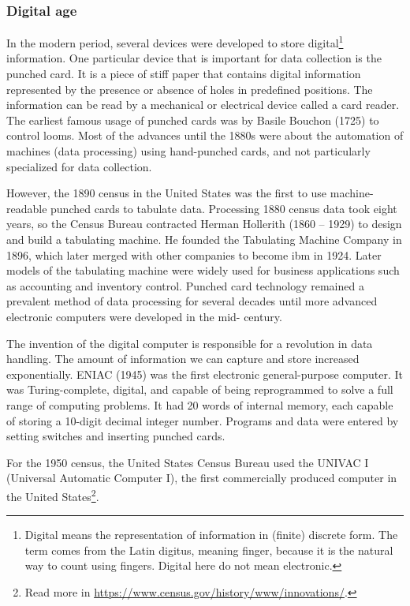 \subsubsection{Digital age}

In the modern period, several devices were developed to store digital\footnote{Digital
means the representation of information in (finite) discrete form.  The term comes from the Latin
digitus, meaning finger, because it is the natural way to count using fingers.  Digital
here do not mean electronic.}
information.  One particular device that is important for data collection is the punched
card.  It is a piece of stiff paper that contains digital information represented by the
presence or absence of holes in predefined positions.  The information can be read by a
mechanical or electrical device called a card reader.  The earliest famous usage of
punched cards was by Basile Bouchon (1725) to control looms.  Most of the advances until
the 1880s were about the automation of machines (data processing) using hand-punched cards, and not
particularly specialized for data collection.

However, the 1890 census in the United States was the first to use machine-readable
punched cards to tabulate data. Processing 1880 census data took eight years, so the
Census Bureau contracted Herman Hollerith (1860 -- 1929) to design and build a tabulating
machine.  He founded the Tabulating Machine Company in 1896, which later merged with other
companies to become \gls{ibm} in 1924. Later
models of the tabulating machine were widely used for business applications such as
accounting and inventory control. Punched card technology remained a prevalent method of
data processing for several decades until more advanced electronic computers were
developed in the mid- century.

The invention of the digital computer is responsible for a revolution in data handling.
The amount of information we can capture and store increased exponentially.  ENIAC (1945) was
the first electronic general-purpose computer.  It was Turing-complete, digital, and
capable of being reprogrammed to solve a full range of computing problems.
It had 20 words of internal memory, each capable of storing a 10-digit decimal integer number.
Programs and data were entered by setting switches and inserting punched cards.

For the 1950 census, the United States Census Bureau used the
UNIVAC I (Universal Automatic Computer I), the first commercially produced computer in the
United States\footnote{Read more in \url{https://www.census.gov/history/www/innovations/}.}.

